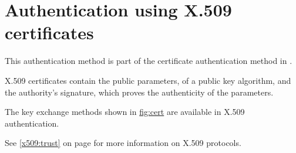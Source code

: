 \section{Authentication using X.509 certificates}

This authentication method is part of the certificate authentication
method in \gnutls{}.
\par
X.509 certificates contain the public parameters, 
of a public key algorithm, and the authority's signature, which proves the
authenticity of the parameters.
\par
The key exchange methods shown in \hyperref{figure}{figure }{}{fig:cert} are
available in X.509 authentication. 

See \ref{x509:trust} on page \pageref{x509:trust} for more information
on X.509 protocols.
